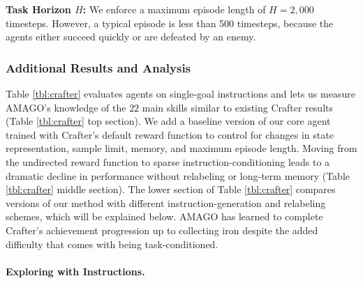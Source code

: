 \textbf{Task Horizon $H$:} We enforce a maximum episode length of $H = 2,000$ timesteps. However, a typical episode is less than 500 timesteps, because the agents either succeed quickly or are defeated by an enemy.

\subsubsection{Additional Results and Analysis}

Table \ref{tbl:crafter} evaluates agents on single-goal instructions and lets us measure AMAGO's knowledge of the $22$ main skills similar to existing Crafter results (Table \ref{tbl:crafter} top section). We add a baseline version of our core agent trained with Crafter's default reward function to control for changes in state representation, sample limit, memory, and maximum episode length. Moving from the undirected reward function to sparse instruction-conditioning leads to a dramatic decline in performance without relabeling or long-term memory (Table \ref{tbl:crafter} middle section). The lower section of Table \ref{tbl:crafter} compares versions of our method with different instruction-generation and relabeling schemes, which will be explained below. AMAGO has learned to complete Crafter's achievement progression up to collecting iron despite the added difficulty that comes with being task-conditioned. 




\paragraph{Exploring with Instructions.}

